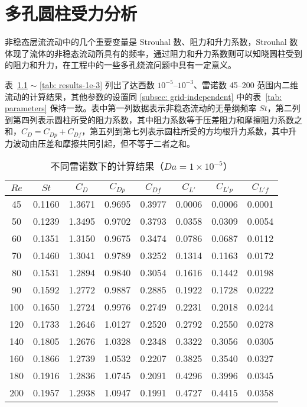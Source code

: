 \chapter{多孔圆柱受力分析}\label{chap: force}

非稳态层流流动中的几个重要变量是 Strouhal 数、阻力和升力系数，Strouhal 数体现了流体的非稳态流动所具有的频率，通过阻力和升力系数则可以知晓圆柱受到的阻力和升力，在工程中的一些多孔绕流问题中具有一定意义。

表~\ref{tab: results-1e-5} $\sim$ \ref{tab: results-1e-3} 列出了达西数 $10^{-5}$--$10^{-3}$、雷诺数 45--200 范围内二维流动的计算结果，其他参数的设置同 \ref{subsec: grid-independent} 中的表~\ref{tab: parameters} 保持一致。表中第一列数据表示非稳态流动的无量纲频率 $St$，第二列到第四列表示圆柱所受的阻力系数，其中阻力系数等于压差阻力和摩擦阻力系数之和，$C_D=C_{Dp}+C_{Df}$，第五列到第七列表示圆柱所受的方均根升力系数，其中升力波动由压差和摩擦共同引起，但不等于二者之和。

\begin{table}[ht]
	\caption{不同雷诺数下的计算结果（$Da=1\times 10^{-5}$）}\label{tab: results-1e-5}
	\vspace{.5em}\centering\wuhao
	\begin{tabular}{*{8}{c}}
		\toprule[1.5pt]
		$Re$ & $St$ & $C_D$ & $C_{Dp}$ & $C_{Df}$ & $C_{L'}$ & $C_{L'p}$ & $C_{L'f}$ \\
		\midrule[1pt]
		45  & 0.1160 & 1.3671 & 0.9695 & 0.3977 & 0.0006 & 0.0006 & 0.0001 \\
		50  & 0.1239 & 1.3495 & 0.9702 & 0.3793 & 0.0358 & 0.0309 &	0.0054 \\
		60  & 0.1351 & 1.3150 & 0.9675 & 0.3474 & 0.0786 & 0.0687 & 0.0112 \\
		70  & 0.1460 & 1.3041 & 0.9789 & 0.3252 & 0.1314 & 0.1163 &	0.0172 \\
		80  & 0.1531 & 1.2894 &	0.9840 & 0.3054 & 0.1616 & 0.1442 &	0.0198 \\
		90  & 0.1592 & 1.2772 &	0.9887 & 0.2885 & 0.1922 & 0.1728 &	0.0222 \\
		100 & 0.1650 & 1.2724 &	0.9976 & 0.2749 & 0.2231 & 0.2018 &	0.0244 \\
		120 & 0.1733 & 1.2646 &	1.0127 & 0.2520 & 0.2792 & 0.2550 &	0.0278 \\
		140 & 0.1805 & 1.2676 &	1.0328 & 0.2348 & 0.3322 & 0.3056 &	0.0305 \\
		160 & 0.1866 & 1.2739 &	1.0532 & 0.2207 & 0.3825 & 0.3540 &	0.0327 \\
		180 & 0.1916 & 1.2836 &	1.0745 & 0.2091 & 0.4296 & 0.3996 &	0.0345 \\
		200 & 0.1957 & 1.2938 &	1.0947 & 0.1991 & 0.4727 & 0.4415 &	0.0358 \\
		\bottomrule[1.5pt]
	\end{tabular}
\end{table}

